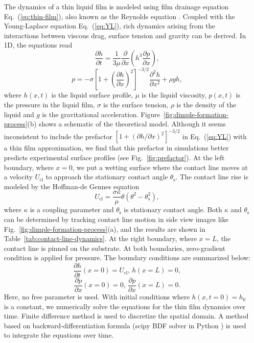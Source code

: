 \documentclass[aps,prfluids,amsmath,amssymb,superscriptaddress,longbibliography]{revtex4-2}
\newif\ifhighlight
\newcommand{\hl}[1]{\ifhighlight\textcolor{blue}{#1}\else#1\fi}
\begin{document}
The dynamics of a thin liquid film is modeled using film drainage equation Eq.~(\ref{eq:thin-film}), also known as the Reynolds equation \cite{guyon2015physical}.
Coupled with the Young-Laplace equation Eq.~(\ref{eq:YL}), rich dynamics arising from the interactions between viscous drag, surface tension and gravity can be derived.
In 1D, the equations read
%
\begin{equation}\label{eq:thin-film}
    \frac{\partial h}{\partial t} = \frac{1}{3\mu} \frac{\partial}{\partial x} \left( h^3 \frac{\partial p}{\partial x} \right),
\end{equation}
%
\begin{equation}\label{eq:YL}
    p = -\sigma \left[1+\left(\frac{\partial h}{\partial x}\right)^2\right]^{-3/2} \frac{\partial^2 h}{\partial x^2} + \rho g h,
\end{equation}
%
where $h(x,t)$ is the liquid surface profile, $\mu$ is the liquid viscosity, $p(x,t)$ is the pressure in the liquid film, $\sigma$ is the surface tension, $\rho$ is the density of the liquid and $g$ is the gravitational acceleration.
Figure~\ref{fig:dimple-formation-process}(b) shows a schematic of the theoretical model.
\hl{Although it seems inconsistent to include the prefactor $[1+(\partial h/\partial x)^2]^{-3/2}$ in Eq.~(\ref{eq:YL}) with a thin film approximation, we find that this prefactor in simulations better predicts experimental surface profiles (see Fig.~\ref{fig:prefactor}). }
At the left boundary, where $x=0$, we put a wetting surface where the contact line moves at a velocity $U_{\mathrm{cl}}$ to approach the stationary contact angle $\theta_{\mathrm{s}}$.
The contact line rise is modeled by the Hoffman-de Gennes equation \cite{Chen1988,Fermigier1991,Eggers2005,Kim2017}
%
\begin{equation}
    U_{\mathrm{cl}} = \frac{\sigma\kappa}{\mu} \theta (\theta^2 - \theta_{\mathrm{s}}^2),
\end{equation}
%
where $\kappa$ is a coupling parameter and $\theta_{\mathrm{s}}$ is stationary contact angle. 
Both $\kappa$ and $\theta_{\mathrm{s}}$ can be determined by tracking contact line motion in side view images like Fig.~\ref{fig:dimple-formation-process}(a), and the results are shown in Table~\ref{tab:contact-line-dynamics}.
At the right boundary, where $x=L$, the contact line is pinned on the substrate.
At both boundaries, zero-gradient condition is applied for pressure.
The boundary conditions are summarized below:
%
\begin{equation}
    \frac{\partial h}{\partial t}(x=0) = U_{\mathrm{cl}},\, h(x=L)=0,
\end{equation}
%
\begin{equation}
    \frac{\partial p}{\partial x}(x=0) =0,\, \frac{\partial p}{\partial x}(x=L) =0.
\end{equation}
%
Here, no free parameter is used. 
With initial conditions where $h(x, t=0)=h_0$ is a constant, we numerically solve the equations for the thin film dynamics over time.
Finite difference method is used to discretize the spatial domain.
A method based on backward-differentiation formula (scipy BDF solver in Python \cite{2020SciPy-NMeth}) is used to integrate the equations over time. 
\end{document}
